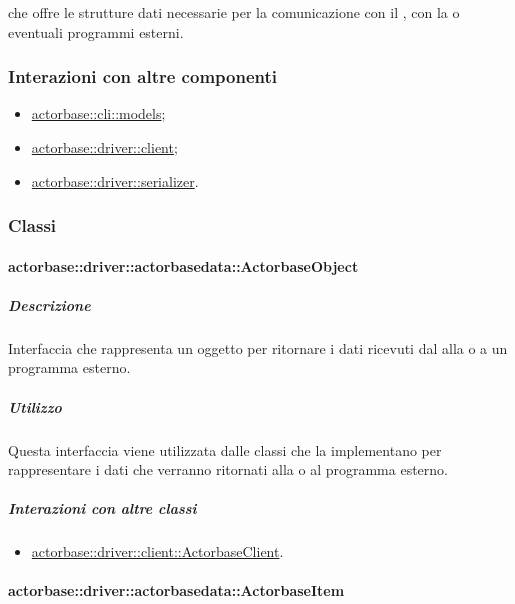 \documentclass{scalatekids-article}
\begin{document}
 che offre le strutture dati necessarie per la comunicazione
con il , con la  o eventuali programmi esterni.

\subsubsection{Interazioni con altre componenti}
\begin{itemize}
\item \hyperref[sec:actorbase::cli::models]{actorbase::cli::models};
\item \hyperref[sec:actorbase::driver::client]{actorbase::driver::client};
\item \hyperref[sec:actorbase::driver::serializer]{actorbase::driver::serializer}.
\end{itemize}

\subsubsection{Classi}

\paragraph{actorbase::driver::actorbasedata::ActorbaseObject}
\label{sec:actorbase::driver::actorbasedata::ActorbaseObject}

\subparagraph{Descrizione}

Interfaccia che rappresenta un oggetto per ritornare i dati
ricevuti dal  alla  o a un programma esterno.

\subparagraph{Utilizzo}

Questa interfaccia viene utilizzata dalle classi che la implementano per
rappresentare i dati che verranno ritornati alla  o al programma
esterno.

\subparagraph{Interazioni con altre classi}

\begin{itemize}
\item \hyperref[sec:actorbase::driver::client::ActorbaseClient]{actorbase::driver::client::ActorbaseClient}.
\end{itemize}

\paragraph{actorbase::driver::actorbasedata::ActorbaseItem}
\label{sec:actorbase::driver::actorbasedata::ActorbaseItem}
\end{document}
